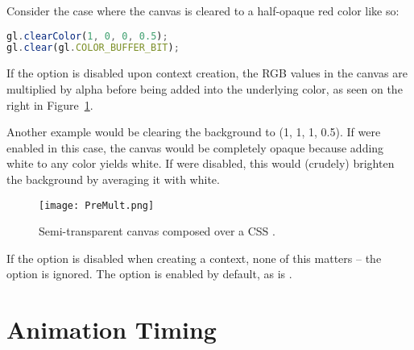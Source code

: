 Consider the case where the canvas is cleared to a half-opaque red color like so:

\begin{lstlisting}[language=JavaScript]
gl.clearColor(1, 0, 0, 0.5);
gl.clear(gl.COLOR_BUFFER_BIT);
\end{lstlisting}

If the  option is disabled upon context creation, the RGB values in the canvas are multiplied by alpha before being added into the underlying color, as seen on the right in Figure~\ref{fig:PreMult}.

Another example would be clearing the background to (1, 1, 1, 0.5).  If  were enabled in this case, the canvas would be completely opaque because adding white to any color yields white.  If  were disabled, this would (crudely) brighten the background by averaging it with white.

\begin{figure}[htb]\centering
  \texttt{[image: PreMult.png]}
  \caption{Semi-transparent canvas composed over a CSS .}
  \label{fig:PreMult}
\end{figure}

If the  option is disabled when creating a context, none of this matters -- the  option is ignored.  The  option is enabled by default, as is .

\begin{comment}
Note that we're not addressing css-opacity.

In this book, we never add children elements to \code{<canvas>}, but there's nothing wrong with doing so.  On some platforms, this can degrade performance, although this is improving as WebGL implementations are maturing.

http://www.svgopen.org/2005/papers/abstractsvgopen/
http://stackoverflow.com/questions/9491417/when-webgl-decide-to-update-the-display?answertab=votes#tab-top

\end{comment}

\section{Animation Timing}


